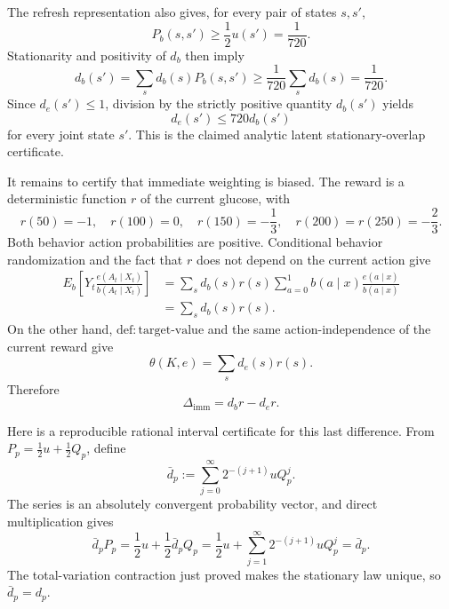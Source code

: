 The refresh representation also gives, for every pair of states
\(s,s'\),
\[
 P_b(s,s')\ge \frac12u(s')=\frac1{720}.
\]
Stationarity and positivity of \(d_b\) then imply
\[
 d_b(s')=\sum_s d_b(s)P_b(s,s')\ge\frac1{720}\sum_s d_b(s)
 =\frac1{720}.
\]
Since \(d_e(s')\le1\), division by the strictly positive quantity
\(d_b(s')\) yields
\[
 d_e(s')\le720d_b(s')
\]
for every joint state \(s'\).  This is the claimed analytic latent
stationary-overlap certificate.

It remains to certify that immediate weighting is biased.  The reward
is a deterministic function \(r\) of the current glucose, with
\[
 r(50)=-1,\quad r(100)=0,\quad r(150)=-\frac13,\quad
 r(200)=r(250)=-\frac23.
\]
Both behavior action probabilities are positive.  Conditional
behavior randomization and the fact that \(r\) does not depend on the
current action give
\[
 \begin{aligned}
 E_b\!\left[Y_t\frac{e(A_t\mid X_t)}{b(A_t\mid X_t)}\right]
 &=\sum_s d_b(s)r(s)\sum_{a=0}^1
       b(a\mid x)\frac{e(a\mid x)}{b(a\mid x)}\\
 &=\sum_s d_b(s)r(s).
 \end{aligned}
\]
On the other hand, \(\mathrm{def{:}target\text{-}value}\) and the same
action-independence of the current reward give
\[
 \theta(K,e)=\sum_s d_e(s)r(s).
\]
Therefore
\[
 \Delta_{\mathrm{imm}}=d_br-d_er.
\]

Here is a reproducible rational interval certificate for this last
difference.  From \(P_p=\tfrac12u+\tfrac12Q_p\), define
\[
 \bar d_p:=\sum_{j=0}^{\infty}2^{-(j+1)}uQ_p^j.
\]
The series is an absolutely convergent probability vector, and direct
multiplication gives
\[
 \bar d_pP_p=\frac12u+\frac12\bar d_pQ_p
 =\frac12u+\sum_{j=1}^{\infty}2^{-(j+1)}uQ_p^j=\bar d_p.
\]
The total-variation contraction just proved makes the stationary law
unique, so \(\bar d_p=d_p\).

